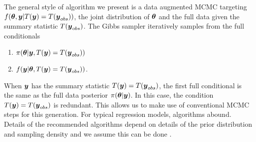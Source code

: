 \documentclass[12pt]{article}
\def\bth{\mbox{\boldmath $\theta$}}
\def\bbeta{\mbox{\boldmath $\beta$}}
\newcommand{\by}{\mbox{\boldmath $y$}}
\newcommand{\green}[1]{{\color{green}#1}}
\begin{document}
The general style of algorithm we present is a data augmented
MCMC targeting $f(\bth, \by |
T(\by)=T(\by_{obs}))$, the joint distribution of $\bth$ and the full
data given the summary statistic $T(\by_{obs})$. 
 The Gibbs sampler \citep{gelfand1990} iteratively samples from the
 full conditionals 
 \begin{enumerate}
 \item $\pi(\bth|\by, T(\by)=T(\by_{obs}))$ 
 \item $f(\by|\bth, T(\by)=T(\by_{obs}))$.  
 \end{enumerate}
When $\by$ has the summary statistic $T(\by) = T(\by_{obs})$,
the first full conditional is the same as the full data posterior $\pi(\bth|\by)$. In this case, the condition $T(\by) = T(\by_{obs})$ is redundant.  This allows us to make use of conventional MCMC steps for this generation.  For typical regression models, algorithms abound. Details of the recommended algorithms depend on details of
the prior distribution and sampling density and we assume this can be done \citep[see e.g.,][]{liu1994, liang2008}.  


\end{document}
